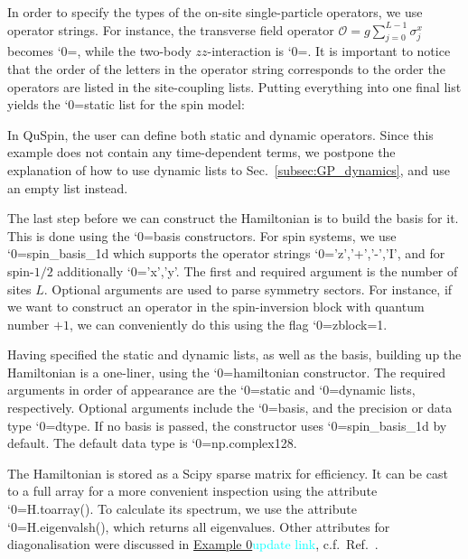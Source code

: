 \documentclass{SciPost}
\newcommand\0{\scalebox{-1}[1]{0}}
\let\svttfamily\ttfamily
\renewcommand\ttfamily{\svttfamily\catcode`0=\active }
\renewcommand\texttt{\bgroup\ttfamily\texttthelp}
\def\texttthelp#1{#1\egroup}
\newcommand*{\cyan}{\textcolor{cyan}}
\newcommand{\JWcode}{example4.py}
\begin{document}
In order to specify the types of the on-site single-particle operators, we use operator strings. For instance, the transverse field operator $\mathcal{O}=g\sum_{j=0}^{L-1}\sigma^x_j$ becomes \texttt{['x',h\_field]}, while the two-body $zz$-interaction is \texttt{['zz',J\_zz]}. It is important to notice that the order of the letters in the operator string corresponds to the order the operators are listed in the site-coupling lists. Putting everything into one final list yields the \texttt{static} list for the spin model:  

In QuSpin, the user can define both static and dynamic operators. Since this example does not contain any time-dependent terms, we postpone the explanation of how to use dynamic lists to Sec.~\ref{subsec:GP_dynamics}, and use an empty list instead.

The last step before we can construct the Hamiltonian is to build the basis for it. This is done using the \texttt{basis} constructors. For spin systems, we use \texttt{spin\_basis\_1d} which supports the operator strings \texttt{'z','+','-','I'}, and for spin-$1/2$ additionally \texttt{'x','y'}. The first and required argument is the number of sites $L$. Optional arguments are used to parse symmetry sectors. For instance, if we want to construct an operator in the spin-inversion block with quantum number $+1$, we can conveniently do this using the flag \texttt{zblock=1}.

Having specified the static and dynamic lists, as well as the basis, building up the Hamiltonian is a one-liner, using the \texttt{hamiltonian} constructor. The required arguments in order of appearance are the \texttt{static} and \texttt{dynamic} lists, respectively. Optional arguments include the \texttt{basis}, and the precision or data type \texttt{dtype}. If no basis is passed, the constructor uses \texttt{spin\_basis\_1d} by default. The default data type is \texttt{np.complex128}.
 
The Hamiltonian is stored as a Scipy sparse matrix for efficiency. It can be cast to a full array for a more convenient inspection using the attribute \texttt{H.toarray()}. To calculate its spectrum, we use the attribute \texttt{H.eigenvalsh()}, which returns all eigenvalues. Other attributes for diagonalisation were discussed in \href{https://github.com/weinbe58/QuSpin/blob/master/examples/scripts/example0.py}{Example 0}\cyan{update link}, c.f.~Ref.~\cite{weinberg_17_quspin}.
 
\end{document}
